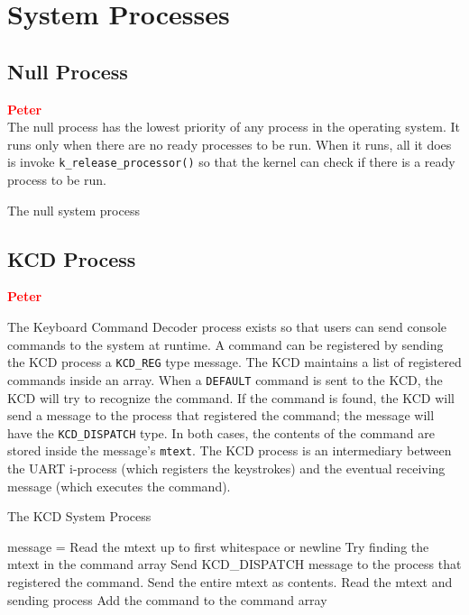 \documentclass[12pt]{report}
\begin{document}
\section{System Processes}

\subsection{Null Process}

\textcolor{red}{\textbf{Peter}} \\

The null process has the lowest priority of any process in the operating system. It runs only when there are no ready processes to be run. When it runs, all it does is invoke {\tt k\_release\_processor()} so that the kernel can check if there is a ready process to be run.

\begin{algorithm}
  \caption{The null system process}
  \begin{algorithmic}[1]
			\State {}
		\EndWhile
    \EndProcedure
  \end{algorithmic}
\end{algorithm}

\subsection{KCD Process}

\textcolor{red}{\textbf{Peter}}

The Keyboard Command Decoder process exists so that users can send console commands to the system at runtime. A command can be registered by sending the KCD process a {\tt KCD\_REG} type message. The KCD maintains a list of registered commands inside an array. When a {\tt DEFAULT} command is sent to the KCD, the KCD will try to recognize the command. If the command is found, the KCD will send a message to the process that registered the command; the message will have the {\tt KCD_DISPATCH} type. In both cases, the contents of the command are stored inside the message's {\tt mtext}. The KCD process is an intermediary between the UART i-process (which registers the keystrokes) and the eventual receiving message (which executes the command).\\

\begin{algorithm}
  \caption{The KCD System Process}
  \begin{algorithmic}[1]
			\State message = 
				\State Read the mtext up to first whitespace or newline
				\State Try finding the mtext in the command array
					\State Send KCD_DISPATCH message to the process that registered the command. Send the entire mtext as contents.
				\EndIf
				\State Read the mtext and sending process
				\State Add the command to the command array
			\EndIf
			\State {}
		\EndWhile
    \EndProcedure
  \end{algorithmic}
\end{algorithm}
\end{document}
